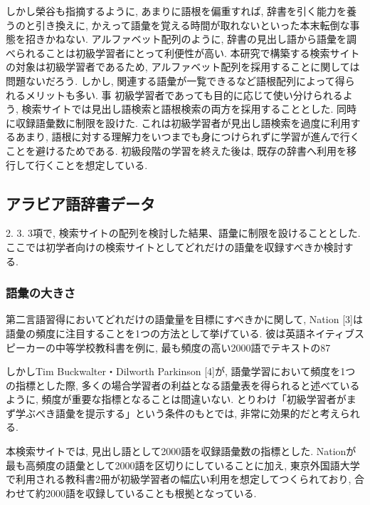 \documentclass[technicalreport]{ieicej}
\begin{document}
しかし榮谷\cite{sakaedani2008}も指摘するように, あまりに語根を偏重すれば, 辞書を引く能力を養うのと引き換えに, かえって語彙を覚える時間が取れないといった本末転倒な事態を招きかねない. アルファベット配列のように, 辞書の見出し語から語彙を調べられることは初級学習者にとって利便性が高い. 本研究で構築する検索サイトの対象は初級学習者であるため, アルファベット配列を採用することに関しては問題ないだろう. しかし, 関連する語彙が一覧できるなど語根配列によって得られるメリットも多い. 事 初級学習者であっても目的に応じて使い分けられるよう, 検索サイトでは見出し語検索と語根検索の両方を採用することとした. 同時に収録語彙数に制限を設けた. これは初級学習者が見出し語検索を過度に利用するあまり, 語根に対する理解力をいつまでも身につけられずに学習が進んで行くことを避けるためである. 初級段階の学習を終えた後は, 既存の辞書へ利用を移行して行くことを想定している. 

\subsection{アラビア語辞書データ}
2. 3. 3項で, 検索サイトの配列を検討した結果、語彙に制限を設けることとした. ここでは初学者向けの検索サイトとしてどれだけの語彙を収録すべきか検討する.

\subsubsection{語彙の大きさ}
第二言語習得においてどれだけの語彙量を目標にすべきかに関して, Nation [3]は語彙の頻度に注目することを1つの方法として挙げている. 彼は英語ネイティブスピーカーの中等学校教科書を例に, 最も頻度の高い2000語でテキストの87%

しかしTim Buckwalter・Dilworth Parkinson [4]が, 語彙学習において頻度を1つの指標とした際, 多くの場合学習者の利益となる語彙表を得られると述べているように, 頻度が重要な指標となることは間違いない. とりわけ「初級学習者がまず学ぶべき語彙を提示する」という条件のもとでは, 非常に効果的だと考えられる.

本検索サイトでは, 見出し語として2000語を収録語彙数の指標とした. Nationが最も高頻度の語彙として2000語を区切りにしていることに加え, 東京外国語大学で利用される教科書2冊が初級学習者の幅広い利用を想定してつくられており, 合わせて約2000語を収録していることも根拠となっている.
\end{document}
